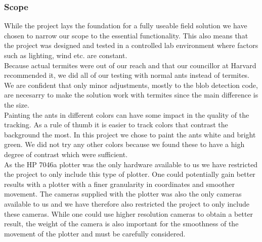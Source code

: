 \subsubsection{Scope} \mbox{}\par


While the project lays the foundation for a fully useable field solution we have chosen to narrow our scope to the essential functionality. This also means that the project was designed and tested in a controlled lab environment where factors such as lighting, wind etc. are constant. \\

Because actual termites were out of our reach and that our councillor at Harvard recommended it, we did all of our testing with normal ants instead of termites. We are confident that only minor adjustments, mostly to the blob detection code, are necesarry to make the solution work with termites since the main difference is the size. \\

Painting the ants in different colors can have some impact in the quality of the tracking. As a rule of thumb it is easier to track colors that contrast the background the most. In this project we chose to paint the ants white and bright green. We did not try any other colors because we found these to have a high degree of contrast which were sufficient. \\

As the HP 7046a plotter was the only hardware available to us we have restricted the project to only include this type of plotter. One could potentially gain better results with a plotter with a finer granularity in coordinates and smoother movement. The cameras supplied with the plotter was also the only cameras available to us and we have therefore also restricted the project to only include these cameras. While one could use higher resolution cameras to obtain a better result, the weight of the camera is also important for the smoothness of the movement of the plotter and must be carefully considered.\\

